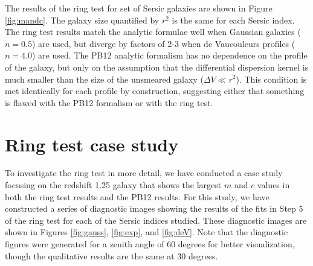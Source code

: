\documentclass[apj]{emulateapj}
\begin{document}
The results of the ring test for set of Sersic galaxies are shown in
Figure \ref{fig:mandc}.  The galaxy size quantified by $r^2$ is the
same for each Sersic index.  The ring test results match the analytic
formulae well when Gaussian galaxies ($n=0.5$) are used, but diverge
by factors of 2-3 when de Vaucouleurs profiles ($n=4.0$) are used.
The PB12 analytic formalism has no dependence on the profile of the
galaxy, but only on the assumption that the differential dispersion
kernel is much smaller than the size of the unsmeared galaxy ($\Delta
V \ll r^2$).  This condition is met identically for each profile by
construction, suggesting either that something is flawed with the PB12
formalism or with the ring test.

\begin{figure*}
\begin{center}
\end{center}
\caption[fig1]{\label{fig:mandc} The shear calibration parameters $m$
  and $c$ plotted against redshift.  The results are obtained from the
  ring test assuming a true PSF derived from an elliptical galaxy
  spectrum and reconstruction PSF derived from a G5v stellar spectrum.
  The true galaxy images are simulated using the values: $r_e = 1.1$,
  and $|g| = 0.2$.  Three values of the galaxy Sersic parameter $n$
  are shown: $n=0.5$, corresponding to a Gaussian profile (blue),
  $n=1.0$, corresponding to an exponential profile (green), and
  $n=4.0$, corresponding to a de Vaucouleurs profile (red).  The cyan
  line in each panel shows the analytic result from the PB12
  formalism.  The zenith angle is 30 degrees.}
\end{figure*}

\section{Ring test case study}\label{sec:casestudy}

To investigate the ring test in more detail, we have conducted a case
study focusing on the redshift 1.25 galaxy that shows the largest $m$
and $c$ values in both the ring test results and the PB12 results.
For this study, we have constructed a series of diagnostic images
showing the results of the fits in Step 5 of the ring test for each of
the Sersic indices studied.  These diagnostic images are shown in
Figures \ref{fig:gauss}, \ref{fig:exp}, and \ref{fig:deV}.  Note that
the diagnostic figures were generated for a zenith angle of 60 degrees
for better visualization, though the qualitative results are the same
at 30 degrees.
\end{document}
